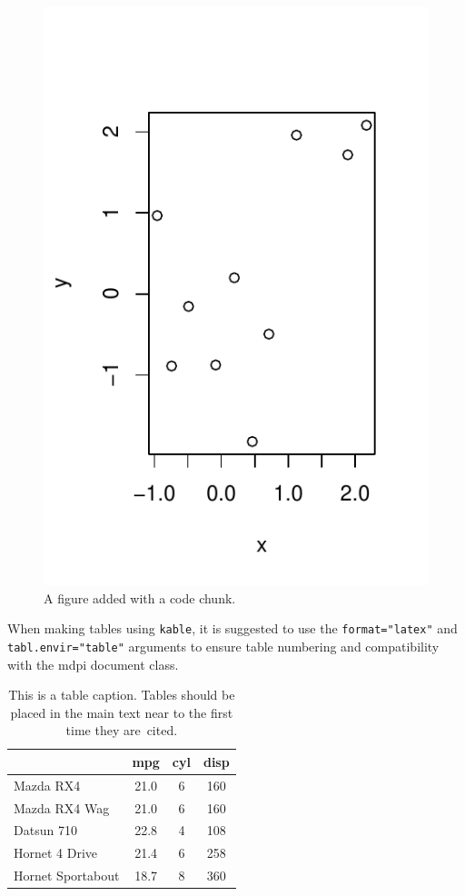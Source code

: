 \documentclass[notspecified,article,submit,moreauthors,pdftex]{Definitions/mdpi}
\begin{document}
\begin{figure}
\centering
\includegraphics{ProyectoAED2023_files/figure-latex/fig1-1.pdf}
\caption{A figure added with a code chunk.\label{fig:fig1}}
\end{figure}

When making tables using \texttt{kable}, it is suggested to use the
\texttt{format="latex"} and \texttt{tabl.envir="table"} arguments to
ensure table numbering and compatibility with the mdpi document class.

\begin{table}[H]

\caption{\label{tab:tab1}This is a table caption. Tables should be placed in the 
             main text near to the first time they are~cited.}
\begin{tabular}[t]{lccc}
\toprule
  & mpg & cyl & disp\\
\midrule
Mazda RX4 & 21.0 & 6 & 160\\
Mazda RX4 Wag & 21.0 & 6 & 160\\
Datsun 710 & 22.8 & 4 & 108\\
Hornet 4 Drive & 21.4 & 6 & 258\\
Hornet Sportabout & 18.7 & 8 & 360\\
\bottomrule
\end{tabular}
\end{table}
\end{document}
